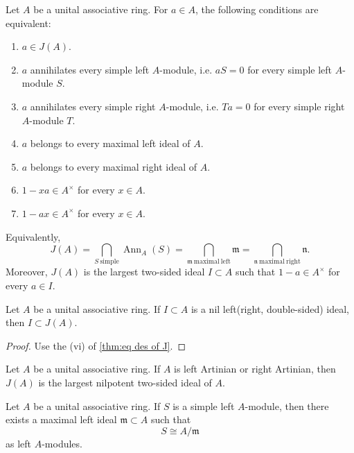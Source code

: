 \begin{theorem}\label{thm:eq des of J}
Let \(A\) be a unital associative ring. For \(a\in A\), the following
conditions are equivalent:
\begin{enumerate}
    \item[(i)] \(a\in J(A)\).
    \item[(ii)] \(a\) annihilates every simple left \(A\)-module, i.e.
    \(aS=0\) for every simple left \(A\)-module \(S\).
    \item[(iii)] \(a\) annihilates every simple right \(A\)-module, i.e.
    \(Ta=0\) for every simple right \(A\)-module \(T\).
    \item[(iv)] \(a\) belongs to every maximal left ideal of \(A\).
    \item[(v)] \(a\) belongs to every maximal right ideal of \(A\).
    \item[(vi)] \(1-xa\in A^\times\) for every \(x\in A\).
    \item[(vii)] \(1-ax\in A^\times\) for every \(x\in A\).
\end{enumerate}
Equivalently,
\[
J(A)=\bigcap_{S\ \mathrm{simple}}\operatorname{Ann}_A(S)
     =\bigcap_{\mathfrak m\ \mathrm{maximal\ left}}\mathfrak m
     =\bigcap_{\mathfrak n\ \mathrm{maximal\ right}}\mathfrak n .
\]
Moreover, \(J(A)\) is the largest two-sided ideal \(I\subset A\) such that
\(1-a\in A^\times\) for every \(a\in I\).
\end{theorem}

\begin{theorem}
Let \(A\) be a unital associative ring. If \(I\subset A\) is a nil left(right, double-sided) ideal,
then \(I\subset J(A)\).
\end{theorem}
\begin{proof}
    Use the (vi) of \autoref{thm:eq des of J}.
\end{proof}

\begin{theorem} \label{thm:jacobson-radical-artinian} 
    Let \(A\) be a unital associative ring. If \(A\) is left Artinian or right Artinian, then \(J(A)\) is the largest nilpotent two-sided ideal of \(A\).
\end{theorem}

\begin{theorem} \label{thm:simple-left-modules-quotients} 
    Let \(A\) be a unital associative ring. If \(S\) is a simple left \(A\)-module, then there exists a maximal left ideal \(\mathfrak m\subset A\) such that \[ S\cong A/\mathfrak m \] as left \(A\)-modules. 
\end{theorem}

